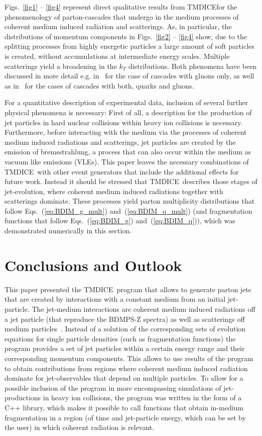 \documentclass[preprint,12pt]{elsarticle}
\newcommand{\tmdice}{{\sf TMDICE}}
\begin{document}
Figs.~\ref{fig1} -- \ref{fig4} represent direct qualitative results from \tmdice\;for the phenomenology of parton-cascades that undergo in the medium processes of coherent medium induced radiation and scatterings. As, in particular, the distributions of momentum components in Figs.~\ref{fig2} -- \ref{fig4} show, due to the splitting processes from highly energetic particles a large amount of soft particles is created, without accumulations at intermediate energy scales. Multiple scatterings yield a broadening in the $k_T$ distributions. Both phenomena have been discussed in more detail e.g. in~\cite{Kutak:2018dim,Blanco:2020uzy} for the case of cascades with gluons only, as well as in~\cite{Blanco:2021usa} for the cases of cascades with both, quarks and gluons. 

For a quantitative description of experimental data, inclusion of several further physical phenomena is necessary: First of all, a description for the production of jet particles in hard nuclear collisions within heavy ion collisions is necessary. 
Furthermore, before interacting with the medium via the processes of coherent medium induced radiations and scatterings, jet particles are created by the emission of bremsstrahlung, a process that can also occur within the medium as vacuum like emissions (VLEs). 
This paper leaves the necessary combinations of \tmdice~with other event generators that include the additional effects for future work. 
Instead it should be stressed that \tmdice~describes those stages of jet-evolution, where coherent medium induced radiations together with scatterings dominate. These processes yield parton multiplicity distributions that follow Eqs.~(\ref{eq:BDIM_g_mult}) and~(\ref{eq:BDIM_q_mult}) (and fragmentation functions that follow Eqs.~(\ref{eq:BDIM_g}) and~(\ref{eq:BDIM_q})), which was demonstrated numerically in this section.
\section{Conclusions and Outlook}
\label{sec4}
This paper presented the \tmdice\, program that allows to generate parton jets that are created by interactions with a constant medium from an initial jet-particle. 
The jet-medium interactions are coherent medium induced radiations off a jet particle (that reproduce the BDMPS-Z spectra) as well as scatterings off medium particles~\cite{Blaizot:2012fh,Blaizot:2013vha,Blanco:2021usa}.
Instead of a solution of the corresponding sets of evolution equations for single particle densities (such as fragmentation functions) the program provides a set of jet particles within a certain energy range and their corresponding momentum components.
This allows to use results of the program to obtain contributions from regions where coherent medium induced radiation dominate for jet-observables that depend on multiple particles.
To allow for a possible inclusion of the program in more encompassing simulations of jet-productions in heavy ion collisions, the program was written in the form of a C++ library, which makes it possible to call functions that obtain in-medium fragmentation in a region (of time and jet-particle energy, which can be set by the user) in which coherent radiation is relevant.
\end{document}
